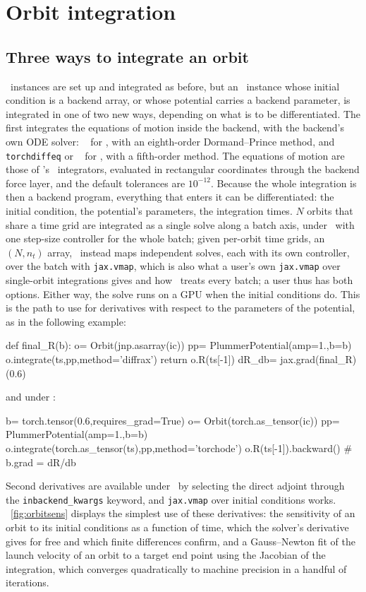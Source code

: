 \section{Orbit integration}\label{sec:orbit}

\subsection{Three ways to integrate an orbit}\label{sec:orbit-paths}

\orb\ instances are set up and integrated as before, but an \orb\ instance whose
initial condition is a backend array, or whose potential carries a
backend parameter, is integrated in one of two new ways, depending on
what is to be differentiated. The first integrates the equations of
motion inside the backend, with the backend's own ODE solver:
\diffrax\ \citep{Kidger2021} for \jax, with an eighth-order
Dormand--Prince method, and \texttt{torchdiffeq} \citep{Chen2018} or
\torchode\ \citep{LienenGunnemann2022} for \torch, with a fifth-order method.
The equations of motion are those of \galpy's \cc\ integrators,
evaluated in rectangular coordinates through the backend force layer,
and the default tolerances are $10^{-12}$. Because the whole integration
is then a backend program, everything that enters it can be
differentiated: the initial condition, the potential's parameters, the
integration times. $N$ orbits that share a time grid are integrated as
a single solve along a batch axis, under \jax\ with one step-size
controller for the whole batch; given per-orbit time grids, an
$(N,n_t)$ array, \galpy\ instead maps independent solves, each with its
own controller, over the batch with \texttt{jax.vmap}, which is also
what a user's own \texttt{jax.vmap} over single-orbit integrations
gives and how \torchode\ treats every batch; a user thus has both
options. Either way, the solve runs on
a GPU when the initial conditions do. This is the path to use for
derivatives with respect to the parameters of the potential, 
as in the following example:
\begin{code}
def final_R(b):
    o= Orbit(jnp.asarray(ic))
    pp= PlummerPotential(amp=1.,b=b)
    o.integrate(ts,pp,method='diffrax')
    return o.R(ts[-1])
dR_db= jax.grad(final_R)(0.6)
\end{code}
and under \torch:
\begin{code}
b= torch.tensor(0.6,requires_grad=True)
o= Orbit(torch.as_tensor(ic))
pp= PlummerPotential(amp=1.,b=b)
o.integrate(torch.as_tensor(ts),pp,method='torchode')
o.R(ts[-1]).backward() # b.grad = dR/db
\end{code}
Second derivatives are available under \jax\ by selecting the direct
adjoint through the \texttt{inbackend\_kwargs} keyword, and
\texttt{jax.vmap} over initial conditions works. \figurename~\ref{fig:orbitsens} displays the simplest
use of these derivatives: the sensitivity of an orbit to its initial
conditions as a function of time, which the solver's derivative gives
for free and which finite differences confirm, and a Gauss--Newton fit
of the launch velocity of an orbit to a target end point using the
Jacobian of the integration, which converges quadratically to machine
    precision in a handful of iterations.

